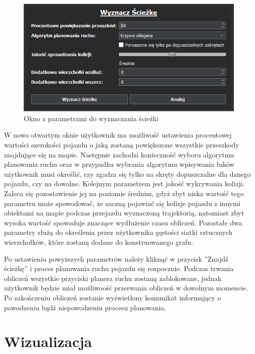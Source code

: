\documentclass[a4paper,11pt,twoside]{report}
\theoremstyle{definition}
\begin{document}
\newpage

\begin{figure}[h!]
\centering
\includegraphics[scale=1.0]{instructionFindPath}
\caption[Okno z parametrami do wyznaczania ścieżki]{Okno z parametrami do wyznaczania ścieżki}
\end{figure}

W nowo otwartym oknie użytkownik ma możliwość ustawienia procentowej wartości szerokości pojazdu o jaką zostaną powiększone wszystkie przeszkody znajdujące się na mapie. Następnie zachodzi konieczność wyboru algorytmu planowania ruchu oraz w przypadku wybrania algorytmu wpisywania łuków użytkownik musi określić, czy zgadza się tylko na skręty dopuszczalne dla danego pojazdu, czy na dowolne. Kolejnym parametrem jest jakość wykrywania kolizji. Zaleca się pozostawienie jej na poziomie średnim, gdyż zbyt niska wartość tego parametru może spowodować, że zaczną pojawiać się kolizje pojazdu z innymi obiektami na mapie podczas przejazdu wyznaczoną trajektorią, natomiast zbyt wysoka wartość spowoduje znaczące wydłużenie czasu obliczeń. Pozostałe dwa parametry służą do określenia przez użytkownika gęstości siatki sztucznych wierzchołków, które zostaną dodane do konstruowanego grafu.

Po ustawieniu powyższych parametrów należy kliknąć w przycisk ''Znajdź ścieżkę'' i proces planowania ruchu pojazdu się rozpocznie. Podczas trwania obliczeń wszystkie przyciski planera ruchu zostaną zablokowane, jednak użytkownik będzie miał możliwoość przerwania obliczeń w dowolnym momencie. Po zakończeniu obliczeń zostanie wyświetlony komunikat informujący o powodzeniu bądź niepowodzeniu procesu planowania.

\section{Wizualizacja}
\end{document}
